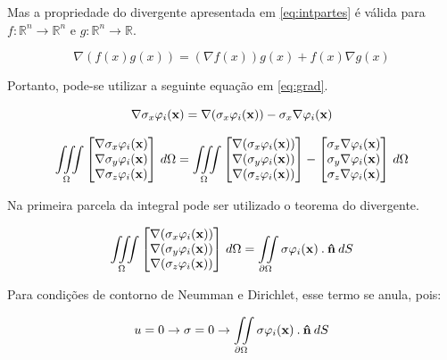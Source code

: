 Mas a propriedade do divergente apresentada em \ref{eq:intpartes} é válida para $f:\mathbb{R}^n \rightarrow \mathbb{R}^n$ e $g:\mathbb{R}^n \rightarrow \mathbb{R}$.

\begin{equation} \label{eq:intpartes}
\nabla (f(x)g(x)) = (\nabla f(x)) g(x) + f(x)\nabla g(x)
\end{equation}


Portanto, pode-se utilizar a seguinte equação em \ref{eq:grad}.

\begin{equation}
\nabla \sigma_x \varphi_i(\mathbf{x}) = \nabla (\sigma_x \varphi_i(\mathbf{x})) - \sigma_x \nabla \varphi_i(\mathbf{x})
\end{equation}


\begin{equation}
\iiint\limits_{\Omega} 
\begin{bmatrix}
\nabla \sigma_x \varphi_i(\mathbf{x})\\ \nabla \sigma_y \varphi_i(\mathbf{x}) \\ \nabla \sigma_z \varphi_i(\mathbf{x})
\end{bmatrix} \, d\Omega = \iiint\limits_{\Omega} 
\begin{bmatrix}
\nabla (\sigma_x \varphi_i(\mathbf{x}))\\ \nabla (\sigma_y \varphi_i(\mathbf{x})) \\ \nabla (\sigma_z \varphi_i(\mathbf{x}))
\end{bmatrix}
-
\begin{bmatrix}
 \sigma_x \nabla \varphi_i(\mathbf{x})\\  \sigma_y \nabla \varphi_i(\mathbf{x}) \\  \sigma_z \nabla \varphi_i(\mathbf{x})
\end{bmatrix}
 \, d\Omega
\end{equation}

Na primeira parcela da integral pode ser utilizado o teorema do divergente. 



\begin{equation}
\iiint\limits_{\Omega} 
\begin{bmatrix}
\nabla (\sigma_x \varphi_i(\mathbf{x}))\\ \nabla (\sigma_y \varphi_i(\mathbf{x})) \\ \nabla (\sigma_z \varphi_i(\mathbf{x}))
\end{bmatrix}
 \, d\Omega
=
\iint\limits_{\partial \Omega} \sigma \varphi_i(\mathbf{x}) \: . \: \mathbf{\hat{n}} \: dS
\end{equation}

Para condições de contorno de Neumman e Dirichlet, esse termo se anula, pois:

\begin{equation*}
    u = 0 \rightarrow \sigma = 0 \rightarrow \iint\limits_{\partial \Omega} \sigma \varphi_i(\mathbf{x}) \: . \: \mathbf{\hat{n}} \: dS
\end{equation*}


